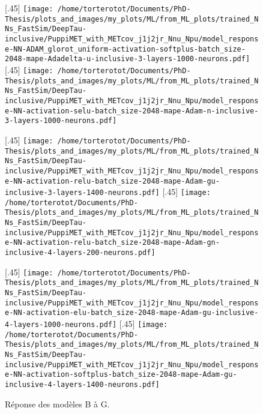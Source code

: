\begin{figure}[p]
\centering

[.45\textwidth]
{\texttt{[image: /home/torterotot/Documents/PhD-Thesis/plots\_and\_images/my\_plots/ML/from\_ML\_plots/trained\_NNs\_FastSim/DeepTau-inclusive/PuppiMET\_with\_METcov\_j1j2jr\_Nnu\_Npu/model\_response-NN-ADAM\_glorot\_uniform-activation-softplus-batch\_size-2048-mape-Adadelta-u-inclusive-3-layers-1000-neurons.pdf]}\vspace{-\baselineskip}}
\hfill
{}[.45\textwidth]
{\texttt{[image: /home/torterotot/Documents/PhD-Thesis/plots\_and\_images/my\_plots/ML/from\_ML\_plots/trained\_NNs\_FastSim/DeepTau-inclusive/PuppiMET\_with\_METcov\_j1j2jr\_Nnu\_Npu/model\_response-NN-activation-selu-batch\_size-2048-mape-Adam-n-inclusive-3-layers-1000-neurons.pdf]}\vspace{-\baselineskip}}

[.45\textwidth]
{\texttt{[image: /home/torterotot/Documents/PhD-Thesis/plots\_and\_images/my\_plots/ML/from\_ML\_plots/trained\_NNs\_FastSim/DeepTau-inclusive/PuppiMET\_with\_METcov\_j1j2jr\_Nnu\_Npu/model\_response-NN-activation-relu-batch\_size-2048-mape-Adam-gu-inclusive-3-layers-1400-neurons.pdf]}\vspace{-\baselineskip}}
\hfill
{}[.45\textwidth]
{\texttt{[image: /home/torterotot/Documents/PhD-Thesis/plots\_and\_images/my\_plots/ML/from\_ML\_plots/trained\_NNs\_FastSim/DeepTau-inclusive/PuppiMET\_with\_METcov\_j1j2jr\_Nnu\_Npu/model\_response-NN-activation-relu-batch\_size-2048-mape-Adam-gn-inclusive-4-layers-200-neurons.pdf]}\vspace{-\baselineskip}}

[.45\textwidth]
{\texttt{[image: /home/torterotot/Documents/PhD-Thesis/plots\_and\_images/my\_plots/ML/from\_ML\_plots/trained\_NNs\_FastSim/DeepTau-inclusive/PuppiMET\_with\_METcov\_j1j2jr\_Nnu\_Npu/model\_response-NN-activation-elu-batch\_size-2048-mape-Adam-gu-inclusive-4-layers-1000-neurons.pdf]}\vspace{-\baselineskip}}
\hfill
{}[.45\textwidth]
{\texttt{[image: /home/torterotot/Documents/PhD-Thesis/plots\_and\_images/my\_plots/ML/from\_ML\_plots/trained\_NNs\_FastSim/DeepTau-inclusive/PuppiMET\_with\_METcov\_j1j2jr\_Nnu\_Npu/model\_response-NN-activation-softplus-batch\_size-2048-mape-Adam-gu-inclusive-4-layers-1400-neurons.pdf]}\vspace{-\baselineskip}}

\caption{Réponse des modèles B à G.}
\label{fig-reponse_model_B_to_G}
\end{figure}
